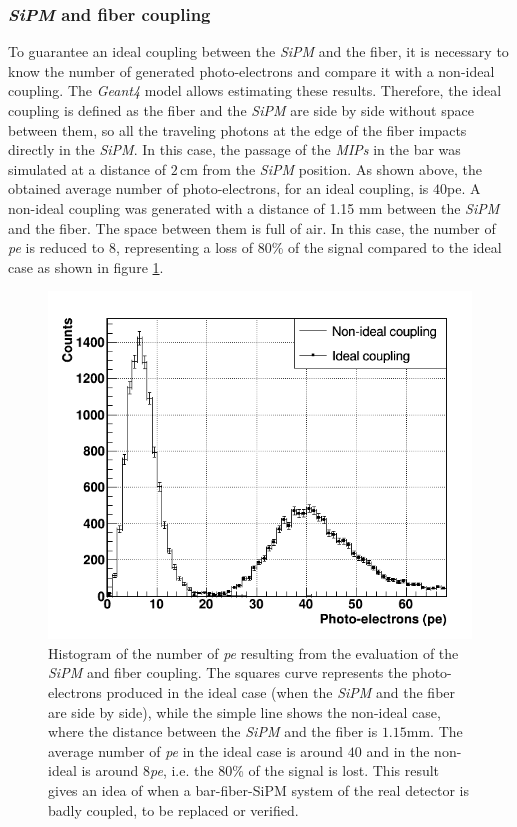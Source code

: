 \documentclass[submitting]{nst}
\begin{document}
\subsubsection{ \textsl{SiPM} and fiber coupling}%
To guarantee an ideal coupling between the \textsl{SiPM} and the fiber, it is necessary to know the number of generated photo-electrons and compare it with a non-ideal coupling. The \textsl{Geant4} model allows estimating these results. Therefore, the ideal coupling is defined as the fiber and the \textsl{SiPM} are side by side without space between them, so all the traveling photons at the edge of the fiber impacts directly in the \textsl{SiPM}. In this case, the passage of the \textsl{MIPs} in the bar was simulated at a distance of $2$\,cm from the \textsl{SiPM} position. As shown above, the obtained average number of photo-electrons, for an ideal coupling, is $40$pe. A non-ideal coupling was generated with a distance of 1.15 mm between the  \textsl{SiPM} and the fiber. The space between them is full of air. In this case, the number of \textsl{pe} is reduced to $8$, representing a loss of 80\% of the signal compared to the ideal case as shown in figure \ref{coupling}.
\begin{figure}
    \centering
    \includegraphics[scale=0.41]{Figures/coupling.png}
    \caption{Histogram of the number of \textsl{pe} resulting from the evaluation of the \textsl{SiPM} and fiber coupling. The squares curve represents the photo-electrons produced in the ideal case (when the \textsl{SiPM} and the fiber are side by side), while the simple line shows the non-ideal case, where the distance between the \textsl{SiPM} and the fiber is $1.15$mm. The average number of \textsl{pe} in the ideal case is around $40$ and in the non-ideal is around $8$\textsl{pe}, i.e. the $80$\% of the signal is lost. This result gives an idea of when a bar-fiber-SiPM system of the real detector is badly coupled, to be replaced or verified.}
    \label{coupling}
\end{figure}
\end{document}
